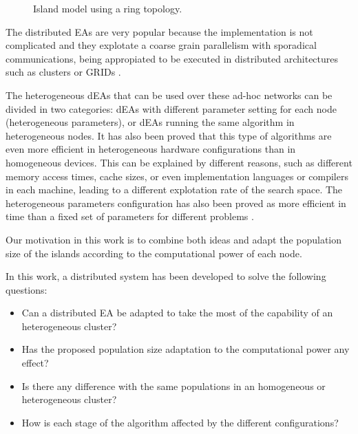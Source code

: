 \begin{figure}
\centering
{}
\caption{Island model using a ring topology.}
\label{fig:islands}
\end{figure}


The distributed EAs are very popular because the implementation is not complicated and they explotate a coarse grain parallelism with sporadical communications, being appropiated to be executed in distributed architectures such as clusters or GRIDs \cite{PLATO}.

The heterogeneous dEAs that can be used over these ad-hoc networks can
be divided in two categories: dEAs with different parameter setting for each node
(heterogeneous parameters), or dEAs running the same algorithm in heterogeneous nodes. It  has also been
proved \cite{HETEROGENEOUSHARD} that this type of algorithms are even
more efficient in heterogeneous hardware configurations than in
homogeneous devices. This can be explained by different reasons, such
as different memory access times, cache sizes, %
or even implementation
languages or compilers in each machine, leading to a different
explotation rate of the search space. %
 The heterogeneous parameters
configuration  has also been proved as more efficient in time than a fixed
set %
of parameters for different problems
\cite{HETEROGENEOUSPARAMETERS}.   %

Our motivation in this work is to combine both ideas and adapt the population size of the islands according to the computational power of each node. 


In this work, a distributed system has been developed to solve the following questions:
\begin{itemize}
 \item Can a distributed EA be adapted to take the most of the capability of an heterogeneous cluster?
 \item Has the proposed population size adaptation to the computational power any effect?
 \item Is there any difference with the same populations in an homogeneous or heterogeneous cluster?
 \item How is each stage of the algorithm affected by the different configurations?
\end{itemize}



